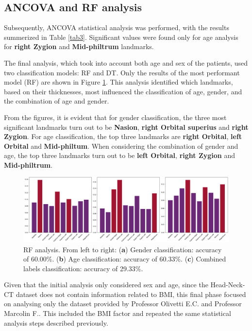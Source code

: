 \documentclass[journal,article,submit,pdftex,moreauthors]{Definitions/mdpi}
\begin{document}
\subsection*{ANCOVA and RF analysis} \label{subsec:ancova-rf-analysis}

Subsequently, ANCOVA statistical analysis was performed, with the results summerized in Table \ref{tab3}. Significant values were found only for age analysis for \textbf{right Zygion} and \textbf{Mid-philtrum} landmarks.

The final analysis, which took into account both age and sex of the patients, used two classification models: RF and DT. Only the results of the most performant model (RF) are shown in Figure {\ref{fig:fig6}}. This analysis identified which landmarks, based on their thicknesses, most influenced the classification of age, gender, and the combination of age and gender. 

From the figures, it is evident that for gender classification, the three most significant landmarks turn out to be \textbf{Nasion}, \textbf{right Orbital superius} and \textbf{right Zygion}. 
For age classification, the top three landmarks are \textbf{right Orbital}, \textbf{left Orbital} and \textbf{Mid-philtum}.
When considering the combination of gender and age, the top three landmarks turn out to be \textbf{left Orbital}, \textbf{right Zygion} and \textbf{Mid-philtrum}.

\vspace{-0.1cm}
\begin{figure}[H]
    \centering
    \includegraphics[width=1\linewidth]{Definitions/RF_analysis_1.png}
    \vspace{-0.5cm}
    \caption{RF analysis. From left to right: (\textbf{a}) Gender classification: accuracy of 60.00\%. (\textbf{b}) Age classification: accuracy of 60.33\%. (\textbf{c}) Combined labels classification: accuracy of 29.33\%.} 
    \label{fig:fig6}
\end{figure}

\noindent Given that the initial analysis only considered sex and age, since the Head-Neck-CT dataset does not contain information related to BMI, this final phase focused on analysing only the dataset provided by Professor Olivetti E.C. and Professor Marcolin F.. This included the BMI factor and repeated the same statistical analysis steps described previously.
\end{document}
